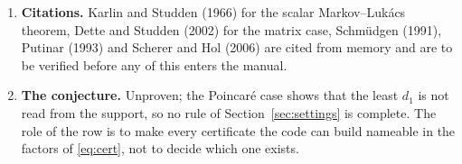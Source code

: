 \documentclass[12pt]{article}
\theoremstyle{plain}
\theoremstyle{definition}
\theoremstyle{remark}
\begin{document}
\begin{enumerate}
\item \textbf{Citations.} Karlin and Studden (1966) for the scalar Markov--Luk\'acs theorem, Dette and Studden (2002) for the matrix case, Schm\"udgen (1991), Putinar (1993) and Scherer and Hol (2006) are cited from memory and are to be verified before any of this enters the manual.
\item \textbf{The conjecture.} Unproven; the Poincar\'e case shows that the least $d_1$ is not read from the support, so no rule of Section~\ref{sec:settings} is complete. The role of the row is to make every certificate the code can build nameable in the factors of \eqref{eq:cert}, not to decide which one exists.
\end{enumerate}
\end{document}
